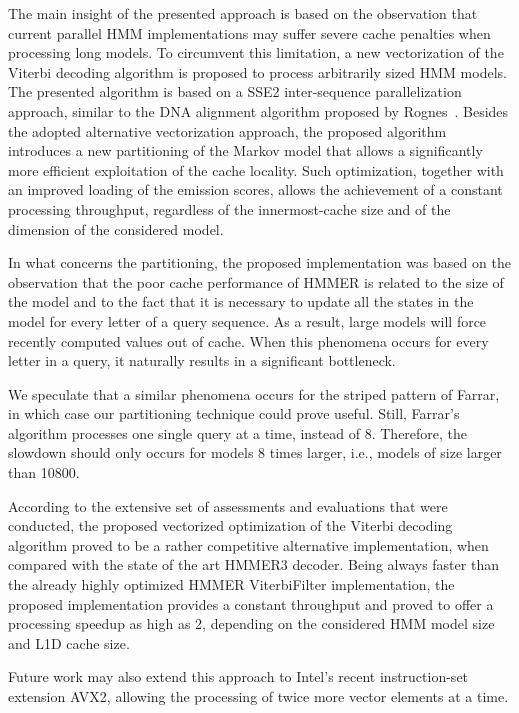 \documentclass{bmcart}
\begin{document}
The main insight of the presented approach is based on the observation
that current parallel \ac{HMM} implementations may suffer severe cache
penalties when processing long models. To circumvent this limitation,
a new vectorization of the Viterbi decoding algorithm is proposed to
process arbitrarily sized \ac{HMM} models. The presented algorithm is
based on a SSE2 inter-sequence parallelization approach, similar to
the DNA alignment algorithm proposed by Rognes~\cite{rognes}. Besides
the adopted alternative vectorization approach, the proposed algorithm
introduces a new partitioning of the Markov model that allows a
significantly more efficient exploitation of the cache locality. Such
optimization, together with an improved loading of the emission
scores, allows the achievement of a constant processing throughput,
regardless of the innermost-cache size and of the dimension of the
considered model. 

In what concerns the partitioning, the proposed implementation was based on the observation that the poor cache
performance of HMMER is related to the size of the model and to the fact that it
is necessary to update all the states in the model for every letter of
a query sequence. As a result, large models will force recently computed values out
of cache. When this phenomena occurs for every letter in a query,
 it naturally results in a
significant bottleneck. 

We speculate that a similar
phenomena occurs for the striped pattern of Farrar, in which case our
partitioning technique could prove useful. Still, Farrar's algorithm
processes one single query at a time, instead of 8. Therefore, the slowdown
should only occurs for models 8 times larger, i.e., models of size
larger than 10800.

According to the extensive set of assessments and evaluations that
were conducted, the proposed vectorized optimization of the Viterbi
decoding algorithm proved to be a rather competitive alternative
implementation, when compared with the state of the art HMMER3
decoder. Being always faster than the already highly optimized HMMER
ViterbiFilter implementation, the proposed implementation provides a
constant throughput and proved to offer a processing speedup as high
as 2, depending on the considered \ac{HMM} model size and L1D cache size.

Future work may also extend this approach to Intel's recent instruction-set extension AVX2, allowing the processing of twice more vector elements at a time.
\end{document}
